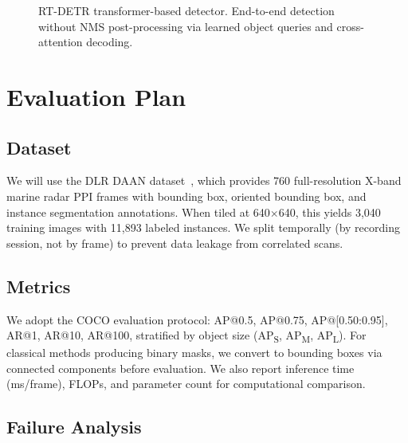 \documentclass[conference]{IEEEtran}
\begin{document}
\begin{figure}[t]
\caption{RT-DETR transformer-based detector. End-to-end detection without NMS post-processing via learned object queries and cross-attention decoding.}
\label{fig:rtdetr_arch}
\end{figure}

\section{Evaluation Plan}

\subsection{Dataset}

We will use the DLR DAAN dataset~\cite{Heuer2025}, which provides 760 full-resolution X-band marine radar PPI frames with bounding box, oriented bounding box, and instance segmentation annotations. When tiled at 640$\times$640, this yields 3,040 training images with 11,893 labeled instances. We split temporally (by recording session, not by frame) to prevent data leakage from correlated scans.

\subsection{Metrics}

We adopt the COCO evaluation protocol: AP@0.5, AP@0.75, AP@[0.50:0.95], AR@1, AR@10, AR@100, stratified by object size (AP\textsubscript{S}, AP\textsubscript{M}, AP\textsubscript{L}). For classical methods producing binary masks, we convert to bounding boxes via connected components before evaluation. We also report inference time (ms/frame), FLOPs, and parameter count for computational comparison.

\subsection{Failure Analysis}
\end{document}
